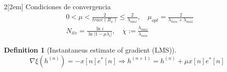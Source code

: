 \documentclass{myclass}
\newtheorem*{definition}{Definition}
\begin{document}
\begin{multicols}{2}[\columnsep2em]
Condiciones de convergencia
\begin{align*}
& 0<\mu<\frac{2}{trace(R_x)}\le \frac{2}{\lambda_{max}}, \quad \mu_{opt}= \frac{2}{\lambda_{min}+\lambda_{max}}\\
& N_{ite} = \frac{\ln \varepsilon }{\ln|1-\mu\lambda_i|}, \quad \chi := \frac{\lambda_{max}}{\lambda_{min}}
\end{align*}

\begin{definition}[Instantaneus estimate of gradient (LMS)]
\[
\nabla \xi (h^{(n)}) = -x[n]e^*[n] \Rightarrow h^{(n+1)} = h^{(n)} + \mu x[n]e^*[n]
\] 
\end{definition}

\end{multicols}
\end{document}
